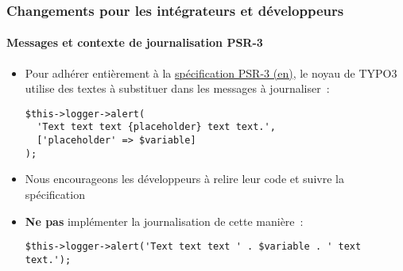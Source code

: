 %

\begin{frame}[fragile]
	\frametitle{Changements pour les intégrateurs et développeurs}
	\framesubtitle{Messages et contexte de journalisation PSR-3}


	\begin{itemize}
		\item Pour adhérer entièrement à la \href{https://www.php-fig.org/psr/psr-3/}{spécification PSR-3 (en)},
			le noyau de TYPO3 utilise des textes à substituer dans les messages à journaliser~:
\begin{lstlisting}
$this->logger->alert(
  'Text text text {placeholder} text text.',
  ['placeholder' => $variable]
);
\end{lstlisting}

		\item Nous encourageons les développeurs à relire leur code et suivre la spécification
		\item \textbf{Ne pas} implémenter la journalisation de cette manière~:
\begin{lstlisting}
$this->logger->alert('Text text text ' . $variable . ' text text.');
\end{lstlisting}

	\end{itemize}

\end{frame}


